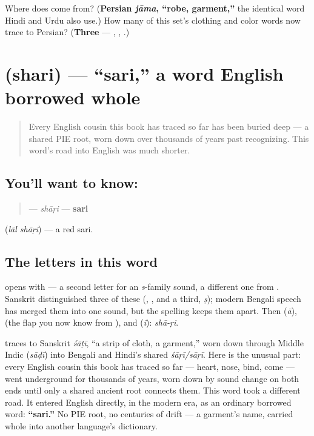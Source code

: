 \begin{tcolorbox}[breakable,colback=teal!4,colframe=teal!35!black,title={Before you move on}]
Where does  come from? (\textbf{Persian \emph{jāma}, \textquotedblleft{}robe, garment,\textquotedblright{}} the identical word Hindi and Urdu also use.) How many of this set's clothing and color words now trace to Persian? (\textbf{Three} — , , .)
\end{tcolorbox}
\section[\texorpdfstring{\bn{শাড়ি} (shari)}{শাড়ি (shari)}]{ (shari) — \textquotedblleft{}sari,\textquotedblright{} a word English borrowed whole}

\label{lesson:BN-C15-shari}



\begin{quote}
Every English cousin this book has traced so far has been buried deep — a shared PIE root, worn down over thousands of years past recognizing. This word's road into English was much shorter.
\end{quote}

\subsection*{You'll want to know: }
\begin{quote}
\textbf{} — \emph{shāṛi} — \textbf{sari}
\end{quote}

  (\emph{lāl shāṛi}) — a red sari.

\subsection*{The letters in this word}
\textbf{} opens with \textbf{} — a second letter for an \emph{s}-family sound, a different one from . Sanskrit distinguished three of these (\textbf{}, \textbf{}, and a third, \emph{ṣ}); modern Bengali speech has merged them into one sound, but the spelling keeps them apart. Then \textbf{} (\emph{ā}), \textbf{} (the flap you now know from ), and \textbf{} (\emph{i}): \emph{shā-ṛi}.

\begin{cousinweb}
\textbf{} traces to Sanskrit \emph{śāṭī}, \textquotedblleft{}a strip of cloth, a garment,\textquotedblright{} worn down through Middle Indic \textbf{} (\emph{sāḍī}) into Bengali and Hindi's shared \emph{śāṛī/sāṛī}. Here is the unusual part: every English cousin this book has traced so far — heart, nose, bind, come — went underground for thousands of years, worn down by sound change on both ends until only a shared ancient root connects them. This word took a different road. It entered English directly, in the modern era, as an ordinary borrowed word: \textbf{\textquotedblleft{}sari.\textquotedblright{}} No PIE root, no centuries of drift — a garment's name, carried whole into another language's dictionary.
\end{cousinweb}

